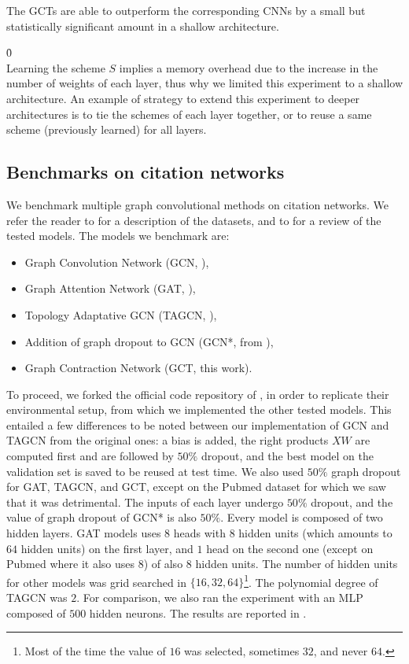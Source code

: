 The GCTs are able to outperform the corresponding CNNs by a small but statistically significant amount in a shallow architecture.

\h{0}\\

Learning the scheme $S$ implies a memory overhead due to the increase in the number of weights of each layer, thus why we limited this experiment to a shallow architecture. An example of strategy to extend this experiment to deeper architectures is to tie the schemes of each layer together, or to reuse a same scheme (previously learned) for all layers.


\subsection{Benchmarks on citation networks}
\label{sec:lss}

We benchmark multiple graph convolutional methods on citation networks. We refer the reader to  for a description of the datasets, and to  for a review of the tested models. The models we benchmark are:
\begin{itemize}[nolistsep,noitemsep]
 \item Graph Convolution Network (GCN, \cite{kipf2016semi}),
 \item Graph Attention Network (GAT, \cite{velickovic2017graph}),
 \item Topology Adaptative GCN (TAGCN,  \cite{du2017topology}),
 \item Addition of graph dropout to GCN (GCN*, from ),
 \item Graph Contraction Network (GCT, this work).
\end{itemize}

To proceed, we forked the official code repository of \cite{velickovic2017graph}, in order to replicate their environmental setup, from which we implemented the other tested models. This entailed a few differences %
to be noted between our implementation of GCN and TAGCN from the original ones: a bias is added, the right products $XW$ are computed first and are followed by $50\%$ dropout, and the best model on the validation set is saved to be reused at test time. We also used $50\%$ graph dropout for GAT, TAGCN, and GCT, except on the Pubmed dataset for which we saw that it was detrimental. The inputs of each layer undergo $50\%$ dropout, and the value of graph dropout of GCN* is also $50\%$. Every model is composed of two hidden layers. GAT models uses $8$ heads with $8$ hidden units (which amounts to $64$ hidden units) on the first layer, and $1$ head on the second one (except on Pubmed where it also uses $8$) of also $8$ hidden units. The number of hidden units for other models was grid searched in $\{16, 32, 64\}$\footnote{Most of the time the value of $16$ was selected, sometimes $32$, and never $64$.}. The polynomial degree of TAGCN was $2$. For comparison, we also ran the experiment with an MLP composed of $500$ hidden neurons. The results are reported in .

